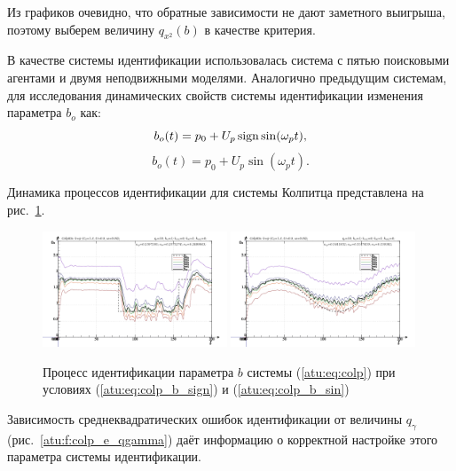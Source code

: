 Из графиков очевидно, что
обратные зависимости не дают заметного выигрыша, поэтому выберем
величину $ q_{x^2}(b) $ в качестве критерия.

В качестве системы идентификации использовалась система с пятью поисковыми агентами и
двумя неподвижными моделями. Аналогично предыдущим системам,
для исследования динамических свойств системы идентификации
изменения параметра $b_o$ как:
%
\begin{equation}
 b_o(t) = p_0 + U_p \operatorname*{sign} \sin( \omega_p t ),
  \label{atu:eq:colp_b_sign}
\end{equation}
%
\begin{equation}
 b_o(t) = p_0 + U_p \sin( \omega_p t ).
  \label{atu:eq:colp_b_sin}
\end{equation}

Динамика процессов идентификации для системы Колпитца представлена на рис.~\ref{atu:f:colp_id}.

\begin{figure}[htb!]
\centerline{
  \includegraphics[width=0.49\textwidth]{p/mod/colp_m5p-pl_n_sign.png}
  \includegraphics[width=0.49\textwidth]{p/mod/colp_m5p-pl_n_sin.png}
}
\caption{Процесс идентификации параметра $b$ системы (\ref{atu:eq:colp})
  при условиях (\ref{atu:eq:colp_b_sign}) и (\ref{atu:eq:colp_b_sin})
}
\label{atu:f:colp_id}
\end{figure}

Зависимость среднеквадратических ошибок идентификации от величины $q_\gamma$ (рис.~\ref{atu:f:colp_e_qgamma})
даёт информацию о корректной настройке этого параметра системы идентификации.

